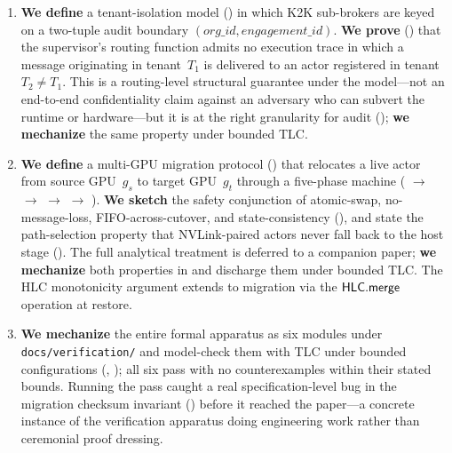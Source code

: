 \begin{enumerate}
\item \textbf{We define} a tenant-isolation model ()
in which K2K sub-brokers are keyed on a two-tuple audit boundary
\((\mathit{org\_id}, \mathit{engagement\_id})\).  \textbf{We prove}
() that the supervisor's routing
function admits no execution trace in which a message originating
in tenant~\(T_1\) is delivered to an actor registered in
tenant~\(T_2 \ne T_1\).  This is a routing-level structural
guarantee under the model—not an end-to-end confidentiality claim
against an adversary who can subvert the runtime or hardware—but it
is at the right granularity for audit ();
\textbf{we mechanize} the same property under bounded TLC.

\item \textbf{We define} a multi-GPU migration protocol
() that relocates a live actor from source
GPU~\(g_s\) to target GPU~\(g_t\) through a five-phase machine
( \(\to\)  \(\to\)
 \(\to\)  \(\to\)
).
\textbf{We sketch} the safety conjunction of atomic-swap,
no-message-loss, FIFO-across-cutover, and state-consistency
(), and state the path-selection
property that NVLink-paired actors never fall back to the host
stage ().  The full analytical
treatment is deferred to a companion paper;
\textbf{we mechanize} both properties in \TLA{} and discharge them
under bounded TLC.  The HLC monotonicity argument extends to
migration via the \(\mathsf{HLC}.\mathsf{merge}\) operation at restore.

\item \textbf{We mechanize} the entire formal apparatus as six
\TLA{} modules under
\texttt{docs/\allowbreak verification/} and model-check them with
TLC under bounded configurations (,
); all six pass with no counterexamples within
their stated bounds.  Running the pass caught a real
specification-level bug in the migration checksum invariant
() before it reached the paper—a concrete
instance of the verification apparatus doing engineering work rather
than ceremonial proof dressing.


\end{enumerate}
